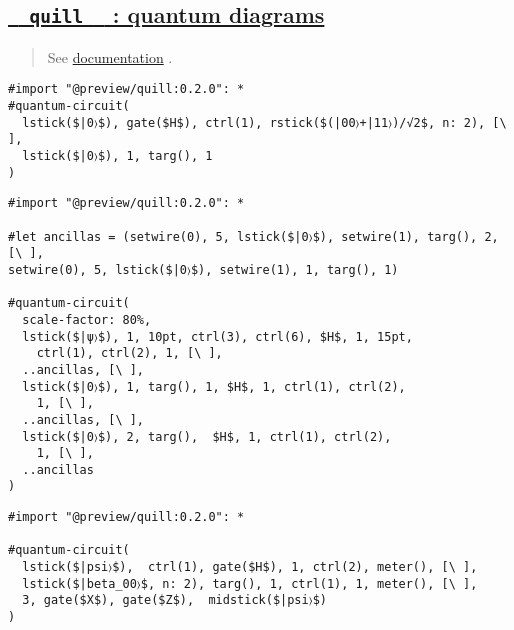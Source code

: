 \pandocbounded{}

\subsection{\texorpdfstring{\hyperref[quill-quantum-diagrams]{\texttt{\ }{\texttt{\ quill\ }}\texttt{\ }
: quantum
diagrams}}{  quill   : quantum diagrams}}\label{quill-quantum-diagrams}

\begin{quote}
See \href{https://github.com/Mc-Zen/quill/tree/main}{documentation} .
\end{quote}

\begin{verbatim}
#import "@preview/quill:0.2.0": *
#quantum-circuit(
  lstick($|0〉$), gate($H$), ctrl(1), rstick($(|00〉+|11〉)/√2$, n: 2), [\ ],
  lstick($|0〉$), 1, targ(), 1
)
\end{verbatim}

\pandocbounded{}

\begin{verbatim}
#import "@preview/quill:0.2.0": *

#let ancillas = (setwire(0), 5, lstick($|0〉$), setwire(1), targ(), 2, [\ ],
setwire(0), 5, lstick($|0〉$), setwire(1), 1, targ(), 1)

#quantum-circuit(
  scale-factor: 80%,
  lstick($|ψ〉$), 1, 10pt, ctrl(3), ctrl(6), $H$, 1, 15pt, 
    ctrl(1), ctrl(2), 1, [\ ],
  ..ancillas, [\ ],
  lstick($|0〉$), 1, targ(), 1, $H$, 1, ctrl(1), ctrl(2), 
    1, [\ ],
  ..ancillas, [\ ],
  lstick($|0〉$), 2, targ(),  $H$, 1, ctrl(1), ctrl(2), 
    1, [\ ],
  ..ancillas
)
\end{verbatim}

\pandocbounded{}

\begin{verbatim}
#import "@preview/quill:0.2.0": *

#quantum-circuit(
  lstick($|psi〉$),  ctrl(1), gate($H$), 1, ctrl(2), meter(), [\ ],
  lstick($|beta_00〉$, n: 2), targ(), 1, ctrl(1), 1, meter(), [\ ],
  3, gate($X$), gate($Z$),  midstick($|psi〉$)
)
\end{verbatim}

\pandocbounded{}
